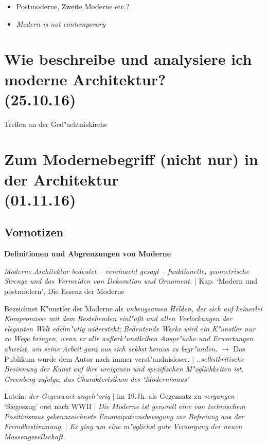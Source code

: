 \documentclass[]{scrartcl}
\begin{document}
\begin{itemize}
    \item Postmoderne, Zweite Moderne etc.?
    \item \emph{Modern is not contemporary}
\end{itemize}

\section{Wie beschreibe und analysiere ich moderne Architektur?\\(25.10.16)}

Treffen an der Ged"achtniskirche


\section{Zum Modernebegriff (nicht nur) in der Architektur\\(01.11.16)}

\subsection{Vornotizen}
\textbf{Definitionen und Abgrenzungen von Moderne}

\begin{description}[leftmargin=!,labelwidth=\widthof{\bfseries P2}]
  \item[Greenberg (Arch.)] \emph{Moderne Architektur bedeutet -- vereinacht gesagt -- funktionelle, geometrische Strenge und das Vermeiden von Dekoration und Ornament.} | Kap. `Modern und postmodern', Die Essenz der Moderne 
  \item[Greenberg (Kunst)] Bezeichnet K"unstler der Moderne als \emph{unbeugsamen Helden, der sich auf keinerlei Kompromisse mit dem Bestehenden einl"a\ss t und allen Verlockungen der eleganten Welt edelm"utig widersteht}; \emph{Bedeutende Werke wird ein K"unstler nur zu Wege bringen, wenn er alle au\ss erk"unstlcihen Anspr"uche und Erwartungen abweist, um seine Arbeit ganz aus sich sekbst heraus zu begr"unden.} $\rightarrow$ Das Publikum wurde dem Autor nach immer verst"andnisloser. | \emph{..selbstkritische Besinnung der Kunst auf ihre ureigenen und spezifischen M"oglichkeiten ist, Greenberg zufolge, das Charakterisikum des `Modernismus' }
  
  \item[Kretschmer] Latein: \emph{der Gegenwart angeh"orig} | im 19.Jh. als Gegensatz zu \emph{vergangen} | `Siegeszug' erst nach WWII | \emph{Die Moderne ist generell eine von technischem Positivismus gekennzeichnete Emanzipationsbewegung zur Befreiung aus der Fremdbestimmung.} | \emph{Es ging um eine m"oglichst gute Versorgung der neuen Massengesellschaft.} 
\end{description}
\end{document}
